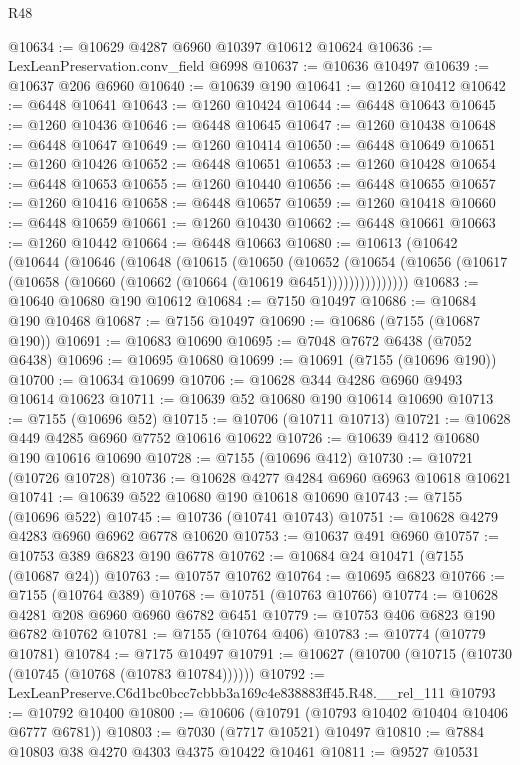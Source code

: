 \begin{lexlean}{R48}
\begin{coremodule}
@10634 := @10629 @4287 @6960 @10397 @10612 @10624
@10636 := LexLeanPreservation.conv_field @6998
@10637 := @10636 @10497
@10639 := @10637 @206 @6960
@10640 := @10639 @190
@10641 := @1260 @10412
@10642 := @6448 @10641
@10643 := @1260 @10424
@10644 := @6448 @10643
@10645 := @1260 @10436
@10646 := @6448 @10645
@10647 := @1260 @10438
@10648 := @6448 @10647
@10649 := @1260 @10414
@10650 := @6448 @10649
@10651 := @1260 @10426
@10652 := @6448 @10651
@10653 := @1260 @10428
@10654 := @6448 @10653
@10655 := @1260 @10440
@10656 := @6448 @10655
@10657 := @1260 @10416
@10658 := @6448 @10657
@10659 := @1260 @10418
@10660 := @6448 @10659
@10661 := @1260 @10430
@10662 := @6448 @10661
@10663 := @1260 @10442
@10664 := @6448 @10663
@10680 := @10613
    (@10642
      (@10644
        (@10646
          (@10648
            (@10615
              (@10650
                (@10652
                  (@10654
                    (@10656 (@10617 (@10658 (@10660 (@10662 (@10664 (@10619 @6451)))))))))))))))
@10683 := @10640 @10680 @190 @10612
@10684 := @7150 @10497
@10686 := @10684 @190 @10468
@10687 := @7156 @10497
@10690 := @10686 (@7155 (@10687 @190))
@10691 := @10683 @10690
@10695 := @7048 @7672 @6438 (@7052 @6438)
@10696 := @10695 @10680
@10699 := @10691 (@7155 (@10696 @190))
@10700 := @10634 @10699
@10706 := @10628 @344 @4286 @6960 @9493 @10614 @10623
@10711 := @10639 @52 @10680 @190 @10614 @10690
@10713 := @7155 (@10696 @52)
@10715 := @10706 (@10711 @10713)
@10721 := @10628 @449 @4285 @6960 @7752 @10616 @10622
@10726 := @10639 @412 @10680 @190 @10616 @10690
@10728 := @7155 (@10696 @412)
@10730 := @10721 (@10726 @10728)
@10736 := @10628 @4277 @4284 @6960 @6963 @10618 @10621
@10741 := @10639 @522 @10680 @190 @10618 @10690
@10743 := @7155 (@10696 @522)
@10745 := @10736 (@10741 @10743)
@10751 := @10628 @4279 @4283 @6960 @6962 @6778 @10620
@10753 := @10637 @491 @6960
@10757 := @10753 @389 @6823 @190 @6778
@10762 := @10684 @24 @10471 (@7155 (@10687 @24))
@10763 := @10757 @10762
@10764 := @10695 @6823
@10766 := @7155 (@10764 @389)
@10768 := @10751 (@10763 @10766)
@10774 := @10628 @4281 @208 @6960 @6960 @6782 @6451
@10779 := @10753 @406 @6823 @190 @6782 @10762
@10781 := @7155 (@10764 @406)
@10783 := @10774 (@10779 @10781)
@10784 := @7175 @10497
@10791 := @10627 (@10700 (@10715 (@10730 (@10745 (@10768 (@10783 @10784))))))
@10792 := LexLeanPreserve.C6d1bc0bcc7cbbb3a169c4e838883ff45.R48.__rel_111
@10793 := @10792 @10400
@10800 := @10606 (@10791 (@10793 @10402 @10404 @10406 @6777 @6781))
@10803 := @7030 (@7717 @10521) @10497
@10810 := @7884 @10803 @38 @4270 @4303 @4375 @10422 @10461
@10811 := @9527 @10531

\end{coremodule}
\end{lexlean}
